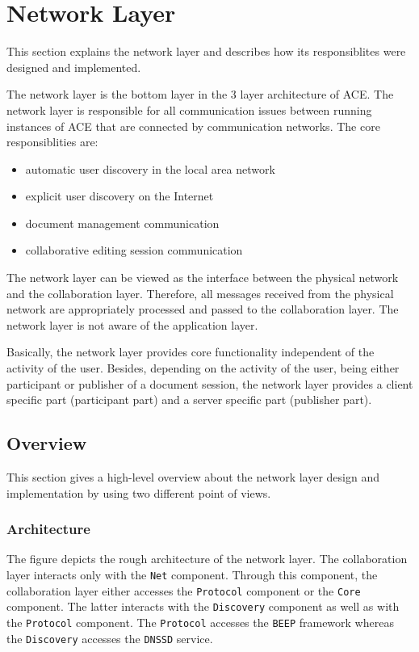 \chapter{Network Layer}
\label{chapter:networklayer}

This section explains the network layer and describes how its responsiblites were designed and implemented.

The network layer is the bottom layer in the 3 layer architecture of ACE. The network layer is responsible for all communication issues between running instances of ACE that are connected by communication networks. The core responsiblities are:

\begin{itemize}
 \item automatic user discovery in the local area network
 \item explicit user discovery on the Internet
 \item document management communication
 \item collaborative editing session communication
\end{itemize}

The network layer can be viewed as the interface between the physical network and the collaboration layer. Therefore, all messages received from the physical network are appropriately processed and passed to the collaboration layer. The network layer is not aware of the application layer.

Basically, the network layer provides core functionality independent of the activity of the user. Besides, depending on the activity of the user, being either participant or publisher of a document session, the network layer provides a client specific part (participant part) and a server specific part (publisher part).


\section{Overview}

This section gives a high-level overview about the network layer design and implementation by using two different point of views.

\subsection{Architecture}

The figure depicts the rough architecture of the network layer. The collaboration layer interacts only with the \texttt{Net} component. Through this component, the collaboration layer either accesses the \texttt{Protocol} component or the \texttt{Core} component. The latter interacts with the \texttt{Discovery} component as well as with the \texttt{Protocol} component. The \texttt{Protocol} accesses the \texttt{BEEP} framework whereas the \texttt{Discovery} accesses the \texttt{DNSSD} service.


